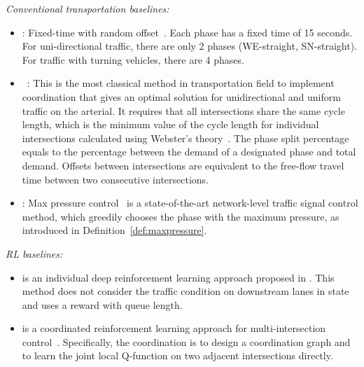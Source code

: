 \textit{Conventional transportation baselines:}
\begin{itemize}[wide,noitemsep,topsep=0pt]

\item \textbf{\FT}: Fixed-time with random offset~\cite{Roess2011t}. Each phase has a fixed time of 15 seconds. For uni-directional traffic, there are only 2 phases (WE-straight, SN-straight). For traffic with turning vehicles, there are 4 phases. 


\item \textbf{\Greenwave}~\cite{Roess2011t}:  This is the most classical method in transportation field to implement coordination that gives an optimal solution for unidirectional and uniform traffic on the arterial. It requires that all intersections share the same cycle length, which is the minimum value of the cycle length for individual intersections calculated using Webster's theory~\cite{Webst58}. The phase split percentage equals to the percentage between the demand of a designated phase and total demand. Offsets between intersections are equivalent to the free-flow travel time between two consecutive intersections. 

\item \textbf{\Maxpressure}: Max pressure control~\cite{varaiya2013max} is a state-of-the-art network-level traffic signal control method, which greedily chooses the phase with the maximum pressure, as introduced in Definition~\ref{def:maxpressure}.

\end{itemize}

\textit{RL baselines:}
\begin{itemize}[wide,noitemsep,topsep=0pt]
\item \textbf{\LIT} is an individual deep reinforcement learning approach proposed in \cite{ZZXW+19}. This method does not consider the traffic condition on downstream lanes in state and uses a reward with queue length. 

\item \textbf{\NIPS} is a coordinated reinforcement learning approach for multi-intersection control~\cite{VaOl16}. Specifically, the coordination is to design a coordination graph and to learn the joint local Q-function on two adjacent intersections directly.
\end{itemize}


